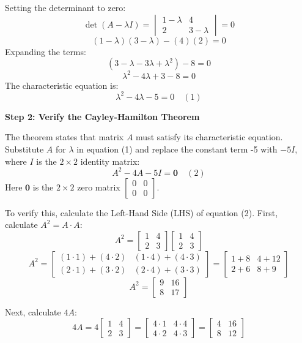 \documentclass{article}
\begin{document}
Setting the determinant to zero:
\[ \det(A - \lambda I) = \begin{vmatrix} 1 - \lambda & 4 \\ 2 & 3 - \lambda \end{vmatrix} = 0 \]
\[ (1 - \lambda)(3 - \lambda) - (4)(2) = 0 \]
Expanding the terms:
\[ (3 - \lambda - 3\lambda + \lambda^2) - 8 = 0 \]
\[ \lambda^2 - 4\lambda + 3 - 8 = 0 \]
The characteristic equation is:
\[ \lambda^2 - 4\lambda - 5 = 0 \quad (1) \]

\textbf{Step 2: Verify the Cayley-Hamilton Theorem}

The theorem states that matrix $A$ must satisfy its characteristic equation. Substitute $A$ for $\lambda$ in equation (1) and replace the constant term -5 with $-5I$, where $I$ is the $2 \times 2$ identity matrix:
\[ A^2 - 4A - 5I = \mathbf{0} \quad (2) \]
Here $\mathbf{0}$ is the $2 \times 2$ zero matrix $\begin{bmatrix} 0 & 0 \\ 0 & 0 \end{bmatrix}$.

To verify this, calculate the Left-Hand Side (LHS) of equation (2).
First, calculate $A^2 = A \cdot A$:
\[ A^2 = \begin{bmatrix} 1 & 4 \\ 2 & 3 \end{bmatrix} \begin{bmatrix} 1 & 4 \\ 2 & 3 \end{bmatrix} \]
\[ A^2 = \begin{bmatrix} (1 \cdot 1) + (4 \cdot 2) & (1 \cdot 4) + (4 \cdot 3) \\ (2 \cdot 1) + (3 \cdot 2) & (2 \cdot 4) + (3 \cdot 3) \end{bmatrix} = \begin{bmatrix} 1 + 8 & 4 + 12 \\ 2 + 6 & 8 + 9 \end{bmatrix} \]
\[ A^2 = \begin{bmatrix} 9 & 16 \\ 8 & 17 \end{bmatrix} \]

Next, calculate $4A$:
\[ 4 A = 4 \begin{bmatrix} 1 & 4 \\ 2 & 3 \end{bmatrix} = \begin{bmatrix} 4 \cdot 1 & 4 \cdot 4 \\ 4 \cdot 2 & 4 \cdot 3 \end{bmatrix} = \begin{bmatrix} 4 & 16 \\ 8 & 12 \end{bmatrix} \]
\end{document}
